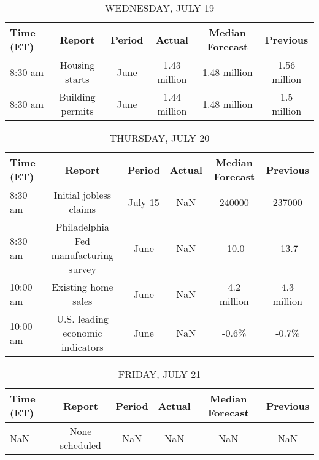 \documentclass{article}%
\begin{document}
\begin{table}[htbp]%
\caption{WEDNESDAY, JULY 19}%
\centering%
\begin{adjustbox}{width=1\textwidth}%
\begin{tabular}{lccccc}
\toprule
Time (ET) &           Report & Period &       Actual & Median Forecast &     Previous \\
\midrule
  8:30 am &   Housing starts &   June & 1.43 million &    1.48 million & 1.56 million \\
  8:30 am & Building permits &   June & 1.44 million &    1.48 million &  1.5 million \\
\bottomrule
\end{tabular}
%
\end{adjustbox}%
\end{table}

%


\begin{table}[htbp]%
\caption{THURSDAY, JULY 20}%
\centering%
\begin{adjustbox}{width=1\textwidth}%
\begin{tabular}{lccccc}
\toprule
Time (ET) &                                Report &  Period & Actual & Median Forecast &    Previous \\
\midrule
  8:30 am &                Initial jobless claims & July 15 &    NaN &          240000 &      237000 \\
  8:30 am & Philadelphia Fed manufacturing survey &    June &    NaN &           -10.0 &       -13.7 \\
 10:00 am &                   Existing home sales &    June &    NaN &     4.2 million & 4.3 million \\
 10:00 am &      U.S. leading economic indicators &    June &    NaN &           -0.6\% &       -0.7\% \\
\bottomrule
\end{tabular}
%
\end{adjustbox}%
\end{table}

%


\begin{table}[htbp]%
\caption{FRIDAY, JULY 21}%
\centering%
\begin{adjustbox}{width=1\textwidth}%
\begin{tabular}{lccccc}
\toprule
Time (ET) &         Report & Period & Actual & Median Forecast & Previous \\
\midrule
      NaN & None scheduled &    NaN &    NaN &             NaN &      NaN \\
\bottomrule
\end{tabular}
%
\end{adjustbox}%
\end{table}
\end{document}

